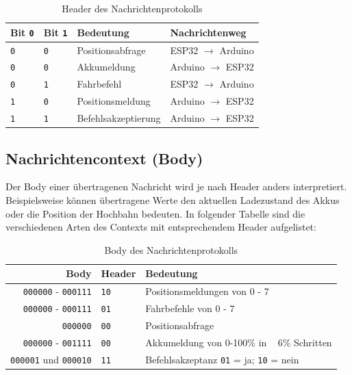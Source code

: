 \begin{table}[h]
	\begin{center}
		\begin{tabular}{m{2cm} | m{2cm} | m{5cm} | m{5cm}}
			Bit \texttt{0} & Bit \texttt{1} & Bedeutung & Nachrichtenweg\\
			\hline 
			\texttt{0} & \texttt{0} & Positionsabfrage  & ESP32 $\rightarrow$ Arduino\\
			\hline 
			\texttt{0} & \texttt{0} & Akkumeldung & Arduino $\rightarrow$ ESP32\\
			\hline 
			\texttt{0} & \texttt{1} & Fahrbefehl & ESP32 $\rightarrow$ Arduino\\
			\hline 
			\texttt{1} & \texttt{0} & Positionsmeldung & Arduino $\rightarrow$ ESP32\\
			\hline 
			\texttt{1} & \texttt{1} & Befehlsakzeptierung & Arduino $\rightarrow$ ESP32\\
		\end{tabular}
	\end{center}
	\caption{\label{tab:header}Header des Nachrichtenprotokolls}
\end{table}

\subsection{Nachrichtencontext (Body)}
Der Body einer übertragenen Nachricht wird je nach Header anders interpretiert. Beispielsweise können übertragene Werte den aktuellen Ladezustand des Akkus oder die Position der Hochbahn bedeuten. 
In folgender Tabelle sind die verschiedenen Arten des Contexts mit entsprechendem Header aufgelistet:

\begin{table}[h]
	\begin{center}
		\begin{tabular}{r | l | l}
			Body & Header & Bedeutung \\
			\hline
			\texttt{000000} - \texttt{000111} & \texttt{10} & Positionsmeldungen von 0 - 7 \\
			\hline
			\texttt{000000} - \texttt{000111} & \texttt{01} & Fahrbefehle von 0 - 7 \\
			\hline
			\texttt{000000} & \texttt{00} & Positionsabfrage \\
			\hline
			\texttt{000000} - \texttt{001111} & \texttt{00} & Akkumeldung von 0-100\% in ~ 6\% Schritten \\
			\hline
			\texttt{000001} und \texttt{000010} & \texttt{11} & Befehlsakzeptanz \texttt{01} = ja; \texttt{10} = nein\\  
		\end{tabular}
	\end{center}
	\caption{\label{tab:body}Body des Nachrichtenprotokolls}
\end{table}

